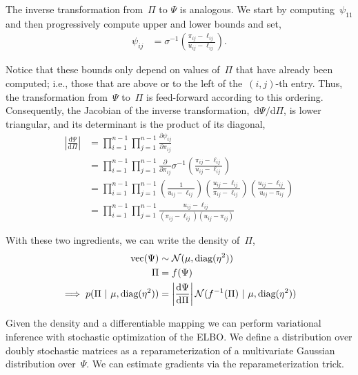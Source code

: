 \documentclass{article}
\begin{document}
The inverse transformation from~${\Pi}$ to $\Psi$ is analogous.
We start by computing~$\psi_{11}$ and then progressively compute
upper and lower bounds and set,
\begin{align}
\psi_{ij} &= \sigma^{-1} \left( \frac{{\pi}_{ij} - \ell_{ij}}{u_{ij} - \ell_{ij}} \right ).
\end{align}


Notice that these bounds only depend on values of~${\Pi}$ that
have already been computed; i.e., those that are above or to the left of
the~$(i,j)$-th entry. Thus, the transformation from~$\Psi$ to~${\Pi}$
is feed-forward according to this ordering.  Consequently, the
Jacobian of the inverse transformation,~$\mathrm{d}\Psi / \mathrm{d} \Pi$,
is lower triangular, and its determinant is the product of its diagonal,
\begin{align}
\left| \frac{\mathrm{d} \Psi } {\mathrm{d} \Pi} \right|
&= \prod_{i=1}^{n-1} \prod_{j=1}^{n-1} \frac{\partial \psi_{ij} }{\partial {\pi}_{ij}} \\
&= \prod_{i=1}^{n-1} \prod_{j=1}^{n-1} \frac{\partial}{\partial {\pi}_{ij}}
\sigma^{-1} \left( \frac{{\pi}_{ij} - \ell_{ij}}{u_{ij} - \ell_{ij}} \right ) \\
&= \prod_{i=1}^{n-1} \prod_{j=1}^{n-1}
\left( \frac{1}{u_{ij} - \ell_{ij}} \right )
\left( \frac{u_{ij} - \ell_{ij}}{{\pi}_{ij} - \ell_{ij}} \right )
\left( \frac{u_{ij} - \ell_{ij}}{u_{ij} - {\pi}_{ij}} \right ) \\
&= \prod_{i=1}^{n-1} \prod_{j=1}^{n-1}
\frac{u_{ij} - \ell_{ij}}{({\pi}_{ij} - \ell_{ij}) (u_{ij} - {\pi}_{ij})}
\end{align}

With these two ingredients, we can write the density of~${\Pi}$,
\begin{align}
  \text{vec} (\Psi) &\sim \mathcal{N}(\mu, \textrm{diag}(\eta^2))
  \\
  {\Pi} &= f(\Psi) \\
  \implies
  p(\Pi ~\vert~ \mu, \textrm{diag}(\eta^2)) &= \left|\frac{\mathrm{d} \Psi }{\mathrm{d} {\Pi}} \right|
  \mathcal{N}(f^{-1}({\Pi}) ~\vert~ \mu, \textrm{diag}(\eta^2))
\end{align}

Given the density and a differentiable mapping we can perform
variational inference with stochastic optimization of the ELBO.
We define a distribution over doubly stochastic matrices as a
reparameterization of a multivariate Gaussian distribution
over~$\Psi$. We can estimate gradients via the reparameterization
trick.
\end{document}
